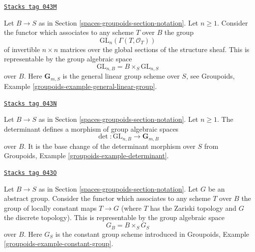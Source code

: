 \begin{example}

\label{spaces-groupoids-example-general-linear-group}
\href{https://stacks.math.columbia.edu/tag/043M}{\texttt{Stacks tag 043M}}

Let $B \to S$ as in Section \ref{spaces-groupoids-section-notation}.
Let $n \geq 1$.
Consider the functor which associates
to any scheme $T$ over $B$ the group
$$
\text{GL}_n(\Gamma(T, \mathcal{O}_T))
$$
of invertible $n \times n$ matrices over
the global sections of the structure sheaf.
This is representable by the group algebraic space
$$
\text{GL}_{n, B} = B \times_S \text{GL}_{n, S}
$$
over $B$. Here $\mathbf{G}_{m, S}$ is the general linear group scheme
over $S$, see
Groupoids, Example \ref{groupoids-example-general-linear-group}.
\end{example}

\begin{example}[Determinant]
\label{spaces-groupoids-example-determinant}
\href{https://stacks.math.columbia.edu/tag/043N}{\texttt{Stacks tag 043N}}

Let $B \to S$ as in Section \ref{spaces-groupoids-section-notation}.
Let $n \geq 1$.
The determinant defines a morphism of group algebraic spaces
$$
\det : \text{GL}_{n, B} \longrightarrow \mathbf{G}_{m, B}
$$
over $B$. It is the base change of the determinant morphism
over $S$ from
Groupoids, Example \ref{groupoids-example-determinant}.
\end{example}

\begin{example}

\label{spaces-groupoids-example-constant-group}
\href{https://stacks.math.columbia.edu/tag/043O}{\texttt{Stacks tag 043O}}

Let $B \to S$ as in Section \ref{spaces-groupoids-section-notation}.
Let $G$ be an abstract group. Consider the functor
which associates to any scheme $T$ over $B$ the group
of locally constant maps $T \to G$ (where $T$ has the Zariski topology
and $G$ the discrete topology). This is representable by the
group algebraic space
$$
G_B = B \times_S G_S
$$
over $B$. Here $G_S$ is the constant group scheme introduced in
Groupoids, Example \ref{groupoids-example-constant-group}.
\end{example}

